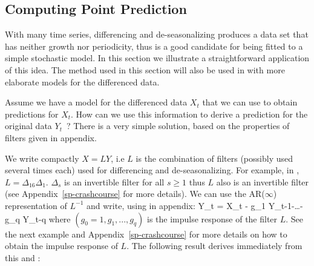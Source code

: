 \subsection{Computing Point Prediction}
\label{sec-fc-d}

With many time series, differencing and
de-seasonalizing produces a data set that has neither
growth nor periodicity, thus is a good candidate for
being fitted to a simple stochastic model. In this
section we illustrate a straightforward application of
this idea. The method used in this section will also
be used in  with more elaborate models
for the differenced data.

Assume we have a model for the differenced data $X_t$
that we can use to obtain predictions for $X_t$. How
can we use this information to derive a prediction for
the original data $Y_t$~? There is a very simple
solution, based on the properties of filters given in
appendix.

We write compactly $X = L Y$, i.e $L$ is the combination of
filters (possibly used several times each) used for
differencing and de-seasonalizing. For example, in
, $L=\Delta_{16}\Delta_1$. $\Delta_s $ is
an invertible filter for all $s\geq 1$ thus $L$ also is an
invertible filter (see Appendix~\ref{sp-crashcourse} for more
details). We can use the AR($\infty$) representation of
$L^{-1}$ and write, using  in appendix:
 \be
 Y_t =   X_t - g_1 Y_{t-1}-\ldots-g_{q} Y_{t-q}
 \ee
where $(g_0=1,g_1,...,g_q)$ is the impulse response of the
filter $L$. See the next example and
Appendix~\ref{sp-crashcourse} for more details on how to obtain
the impulse response of $L$. The following result derives
immediately from this and :

